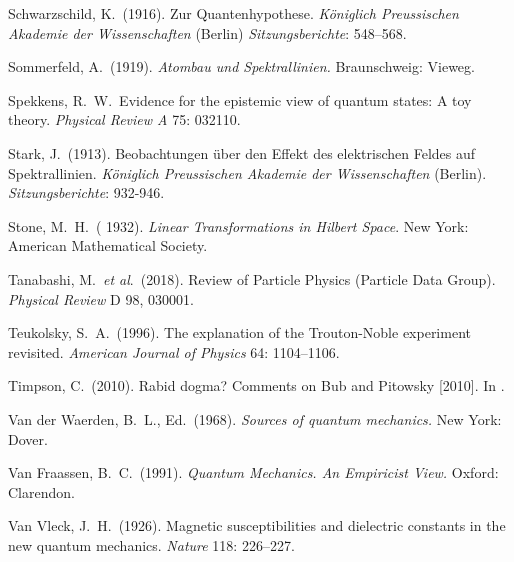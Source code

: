 \documentclass[12pt]{article}
\numberwithin{equation}{section}
\begin{document}
\begin{thebibliography}{}
 Schwarzschild, K.\ (1916). Zur Quantenhypothese. \emph{K\"oniglich Preussischen Akademie der Wissenschaften} (Berlin)  \emph{Sitzungsberichte}: 548--568.

 Sommerfeld, A.\ (1919). \emph{Atombau und Spektrallinien.} Braunschweig: Vieweg.

 Spekkens, R.\ W.\, Evidence for the epistemic view of quantum states: A toy theory. \emph{Physical Review A} 75: 032110.


 Stark, J.\ (1913). Beobachtungen \"uber den Effekt des elektrischen Feldes auf Spektrallinien. {\it K\"oniglich Preussischen Akademie der Wissenschaften} (Berlin). {\it Sitzungsberichte}: 932-946.

 Stone, M.\ H.\  ( 1932). \emph{Linear Transformations in Hilbert Space}. New York: American Mathematical Society.

 Tanabashi, M.\ \emph{et al}.\ (2018). Review of Particle Physics (Particle Data Group). \emph{Physical Review} D 98, 030001.

 Teukolsky, S.\ A.\ (1996). The explanation of the Trouton-Noble experiment revisited. \emph{American Journal of Physics}   64: 1104--1106. 

 Timpson, C.\ (2010). Rabid dogma? Comments on Bub and Pitowsky [2010]. In \citet[pp.\ 460--466]{Many Worlds 2010}.

 Van der Waerden, B.\ L., Ed.\ (1968). \emph{Sources of quantum mechanics.} New York: Dover.

 Van Fraassen, B.\ C.\ (1991). \emph{Quantum Mechanics. An Empiricist View.} Oxford: Clarendon.

 Van Vleck, J.\ H.\ (1926). Magnetic susceptibilities and dielectric constants in the new quantum mechanics. \emph{Nature} 118: 226--227.


\end{thebibliography}
\end{document}
